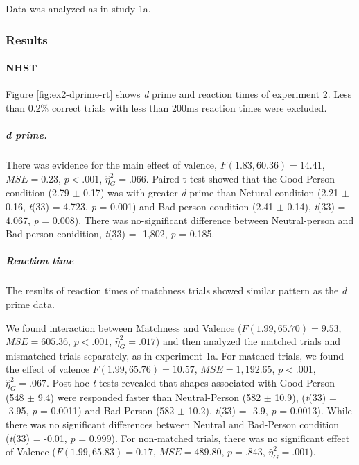 \documentclass[
  english,
  man]{apa6}
\let\oldparagraph\paragraph
\renewcommand{\paragraph}[1]{\oldparagraph{#1}\mbox{}}
\let\oldsubparagraph\subparagraph
\renewcommand{\subparagraph}[1]{\oldsubparagraph{#1}\mbox{}}
\begin{document}
Data was analyzed as in study 1a.

\hypertarget{results-3}{%
\subsubsection{Results}\label{results-3}}

\hypertarget{nhst-1}{%
\paragraph{NHST}\label{nhst-1}}

Figure \ref{fig:ex2-dprime-rt} shows \emph{d} prime and reaction times of experiment 2. Less than 0.2\% correct trials with less than 200ms reaction times were excluded.

\hypertarget{d-prime.}{%
\subparagraph{d prime.}\label{d-prime.}}

There was evidence for the main effect of valence, \(F(1.83, 60.36) = 14.41\), \(\mathit{MSE} = 0.23\), \(p < .001\), \(\hat{\eta}^2_G = .066\). Paired t test showed that the Good-Person condition (2.79 \(\pm\) 0.17) was with greater \emph{d} prime than Netural condition (2.21 \(\pm\) 0.16, \emph{t}(33) = 4.723, \emph{p} = 0.001) and Bad-person condition (2.41 \(\pm\) 0.14), \emph{t}(33) = 4.067, \emph{p} = 0.008). There was no-significant difference between Neutral-person and Bad-person conidition, \emph{t}(33) = -1,802, \emph{p} = 0.185.

\hypertarget{reaction-time-2}{%
\subparagraph{Reaction time}\label{reaction-time-2}}

The results of reaction times of matchness trials showed similar pattern as the \emph{d} prime data.

We found interaction between Matchness and Valence (\(F(1.99, 65.70) = 9.53\), \(\mathit{MSE} = 605.36\), \(p < .001\), \(\hat{\eta}^2_G = .017\)) and then analyzed the matched trials and mismatched trials separately, as in experiment 1a. For matched trials, we found the effect of valence \(F(1.99, 65.76) = 10.57\), \(\mathit{MSE} = 1,192.65\), \(p < .001\), \(\hat{\eta}^2_G = .067\). Post-hoc \emph{t}-tests revealed that shapes associated with Good Person (548 \(\pm\) 9.4) were responded faster than Neutral-Person (582 \(\pm\) 10.9), (\emph{t}(33) = -3.95, \emph{p} = 0.0011) and Bad Person (582 \(\pm\) 10.2), \emph{t}(33) = -3.9, \emph{p} = 0.0013). While there was no significant differences between Neutral and Bad-Person condition (\emph{t}(33) = -0.01, \emph{p} = 0.999). For non-matched trials, there was no significant effect of Valence (\(F(1.99, 65.83) = 0.17\), \(\mathit{MSE} = 489.80\), \(p = .843\), \(\hat{\eta}^2_G = .001\)).
\end{document}
